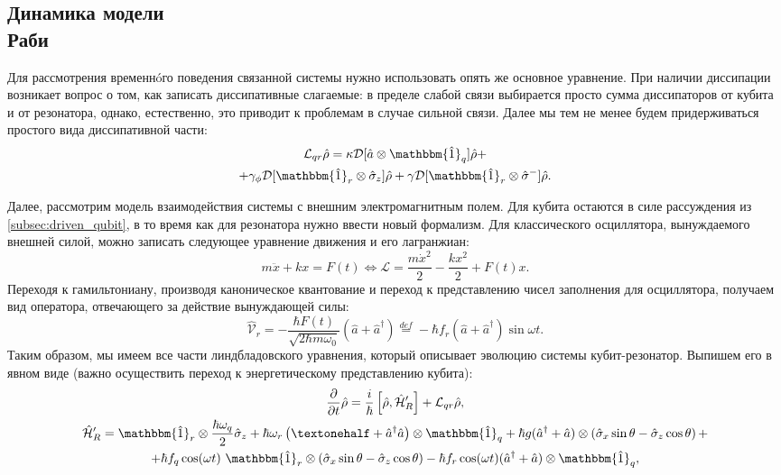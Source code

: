 \documentclass[12pt, twoside]{report}
\numberwithin{equation}{section}
\numberwithin{figure}{section}
\begin{document}
\subsection{Динамика модели\\ Раби} \label{subsec:rabi_specrum_dyn}

Для рассмотрения временнóго поведения связанной системы нужно использовать опять же основное уравнение. При наличии диссипации возникает вопрос о том, как записать диссипативные слагаемые: в пределе слабой связи выбирается просто сумма диссипаторов от кубита и от резонатора, однако, естественно, это приводит к проблемам в случае сильной связи\cite{beaudoin2011}. Далее мы тем не менее будем придерживаться простого вида диссипативной части:
\begin{gather*}
\mathcal{L}_{qr} \hat \rho = \kappa \mathcal{D}[\hat a \otimes \mathbbm{\hat 1}_q]\hat\rho + \\ +\gamma_\phi \mathcal{D}[\mathbbm{\hat 1}_r \otimes \hat \sigma_z]\hat\rho + \gamma\mathcal{D}[\mathbbm{\hat 1}_r \otimes \hat \sigma^-]\hat\rho .
\end{gather*}

Далее, рассмотрим модель взаимодействия системы с внешним электромагнитным полем. Для кубита остаются в силе рассуждения из \autoref{subsec:driven_qubit}, в то время как для резонатора нужно ввести новый формализм.	Для классического осциллятора, вынуждаемого внешней силой, можно записать следующее уравнение движения и его лагранжиан: 
$$m \ddot{x} + k x = F(t) \Leftrightarrow \mathcal{L} = \frac{m \dot{x}^{2}}{2}-\frac{kx^2}{2} + F(t) x .$$
Переходя к гамильтониану, производя каноническое квантование и переход к представлению чисел заполнения для осциллятора, получаем вид оператора, отвечающего за действие вынуждающей силы:
$$
\mathcal{\hat V}_r = -\frac{\hbar F(t)}{\sqrt{2\hbar m \omega_0}} (\hat a + \hat a^{\dag}) \overset{def}{=} - \hbar f_r (\hat a + \hat a^{\dag}) \sin \omega t.
$$
Таким образом, мы имеем все части линдбладовского уравнения, который описывает эволюцию системы кубит-резонатор. Выпишем его в явном виде (важно осуществить переход к энергетическому представлению кубита\cite{ithier2005}):
\begin{gather}
\frac{\partial}{\partial t} \hat \rho= \frac{i}{\hbar}\left[\hat \rho, \mathcal{\hat H}_R^\prime \right] + \mathcal{L}_{qr}\hat \rho, 
\label{eq:master_equation}
\\
\mathcal{\hat H}_R^\prime = \mathbbm{\hat 1}_r \otimes \frac{\hbar \omega_q}{2} \hat \sigma_z  + \hbar \omega_r \left(½ +\hat a^\dag \hat a \right)\otimes \mathbbm{\hat 1}_q + \hbar g (\hat a^\dag + \hat a) \otimes \left( \hat \sigma_x \sin\theta-  \hat\sigma_z \cos\theta \right) + \notag
\\ 
+\hbar f_q \cos(\omega t)~ \mathbbm{\hat 1}_r \otimes \left( \hat \sigma_x \sin\theta -  \hat\sigma_z \cos\theta \right) - \hbar f_r \cos(\omega t) (\hat a^\dag + \hat a)\otimes \mathbbm{\hat 1}_q ,  \notag
\end{gather}
\end{document}
